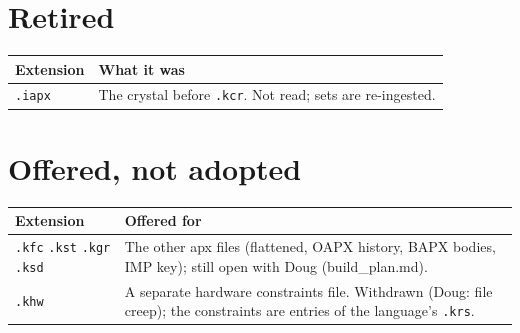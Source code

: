 \section{\texorpdfstring{Retired}{Retired}}

{\small
\setlength{\tabcolsep}{6pt}
\begin{longtable}{>{\RaggedRight\arraybackslash}p{}>{\RaggedRight\arraybackslash}p{}}
\toprule
Extension & What it was \\
\midrule
\endhead
\texttt{.\allowbreak{}iapx} & The crystal before \texttt{.\allowbreak{}kcr}. Not read; sets are re-ingested. \\
\bottomrule
\end{longtable}
}

\section{\texorpdfstring{Offered, not adopted}{Offered, not adopted}}

{\small
\setlength{\tabcolsep}{6pt}
\begin{longtable}{>{\RaggedRight\arraybackslash}p{}>{\RaggedRight\arraybackslash}p{}}
\toprule
Extension & Offered for \\
\midrule
\endhead
\texttt{.\allowbreak{}kfc} \texttt{.\allowbreak{}kst} \texttt{.\allowbreak{}kgr} \texttt{.\allowbreak{}ksd} & The other apx files (flattened, OAPX history, BAPX bodies, IMP key); still open with Doug (build\_\allowbreak{}plan.md). \\
\texttt{.\allowbreak{}khw} & A separate hardware constraints file. Withdrawn (Doug: file creep); the constraints are entries of the language's \texttt{.\allowbreak{}krs}. \\
\bottomrule
\end{longtable}
}

